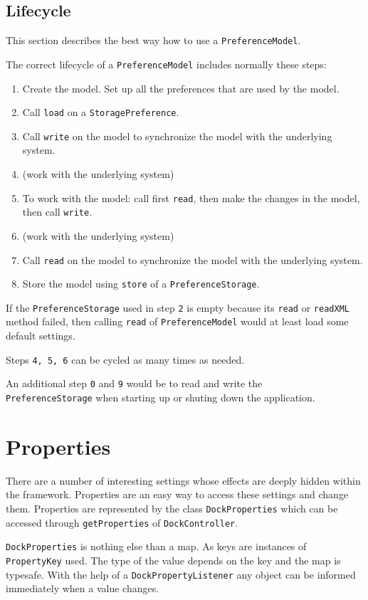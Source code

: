 \documentclass[a4paper,10pt]{article}
\newcommand{\src}[1]{\texttt{#1}}
\begin{document}
\subsection{Lifecycle}
This section describes the best way how to use a \src{PreferenceModel}.

The correct lifecycle of a \src{PreferenceModel} includes normally these steps:
\begin{enumerate}
 \item Create the model. Set up all the preferences that are used by the model.
 \item Call \src{load} on a \src{StoragePreference}.
 \item Call \src{write} on the model to synchronize the model with the underlying system.
 \item (work with the underlying system)
 \item To work with the model: call first \src{read}, then make the changes in the model, then call \src{write}.
 \item (work with the underlying system)
 \item Call \src{read} on the model to synchronize the model with the underlying system.
 \item Store the model using \src{store} of a \src{PreferenceStorage}.
\end{enumerate}

If the \src{PreferenceStorage} used in step \src{2} is empty because its \src{read} or \src{readXML} method failed, then calling \src{read} of \src{PreferenceModel} would at least load some default settings.

Steps \src{4, 5, 6} can be cycled as many times as needed.

An additional step \src{0} and \src{9} would be to read and write the \\\src{PreferenceStorage} when starting up or shuting down the application.

\section{Properties}
There are a number of interesting settings whose effects are deeply hidden within the framework. Properties are an easy way to access these settings and change them. Properties are represented by the class \src{DockProperties} which can be accessed through \src{getProperties} of \src{DockController}.

\src{DockProperties} is nothing else than a map. As keys are instances of \src{PropertyKey} used. The type of the value depends on the key and the map is typesafe. With the help of a \src{DockPropertyListener} any object can be informed immediately when a value changes.
\end{document}
